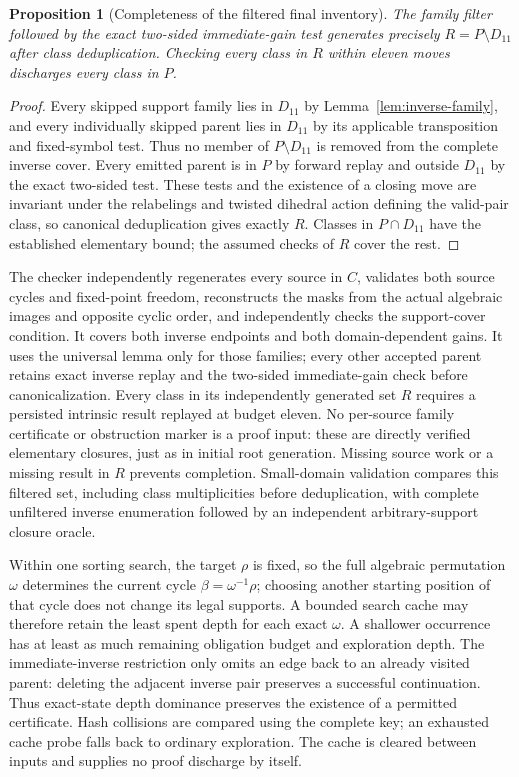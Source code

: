 \documentclass[11pt,a4paper]{article}
\newtheorem{proposition}{Proposition}
\begin{document}
\begin{proposition}[Completeness of the filtered final inventory]
\label{prop:filtered-final-inventory}
The family filter followed by the exact two-sided immediate-gain test
generates precisely $R=P\setminus D_{11}$ after class deduplication. Checking
every class in $R$ within eleven moves discharges every class in $P$.
\end{proposition}
\begin{proof}
Every skipped support family lies in $D_{11}$ by
Lemma~\ref{lem:inverse-family}, and every individually skipped parent lies in
$D_{11}$ by its applicable transposition and fixed-symbol test. Thus no
member of $P\setminus D_{11}$ is removed from the complete inverse cover.
Every emitted parent is in $P$ by forward replay and outside $D_{11}$ by the
exact two-sided test. These tests and the existence of a closing move are
invariant under the relabelings and twisted dihedral action defining the
valid-pair class, so canonical deduplication gives exactly $R$. Classes in
$P\cap D_{11}$ have the established elementary bound; the assumed checks of
$R$ cover the rest.
\end{proof}

The checker independently regenerates every source in $C$, validates both
source cycles and fixed-point freedom, reconstructs the masks from the
actual algebraic images and opposite cyclic order, and independently checks
the support-cover condition. It covers both inverse endpoints and both
domain-dependent gains. It uses the universal lemma only for those families;
every other accepted parent retains exact inverse replay and the two-sided
immediate-gain check before canonicalization. Every class in its independently
generated set $R$ requires a persisted intrinsic result replayed at budget
eleven. No per-source family certificate or obstruction marker is a proof
input: these are directly verified elementary closures, just as in initial
root generation. Missing source work or a missing result in $R$ prevents
completion. Small-domain validation compares this filtered set, including
class multiplicities before deduplication, with complete unfiltered inverse
enumeration followed by an independent arbitrary-support closure oracle.


Within one sorting search, the target $\rho$ is fixed, so the full algebraic
permutation $\omega$ determines the current cycle
$\beta=\omega^{-1}\rho$; choosing another starting position of that cycle
does not change its legal supports. A bounded search cache may therefore
retain the least spent depth for each exact $\omega$. A shallower occurrence
has at least as much remaining obligation budget and exploration depth.
The immediate-inverse restriction only omits an edge back to an already visited
parent: deleting the adjacent inverse pair preserves a successful continuation.
Thus exact-state depth dominance preserves the existence of a permitted
certificate. Hash collisions are compared using the complete key; an exhausted
cache probe falls back to ordinary exploration. The cache is cleared between
inputs and supplies no proof discharge by itself.
\end{document}
